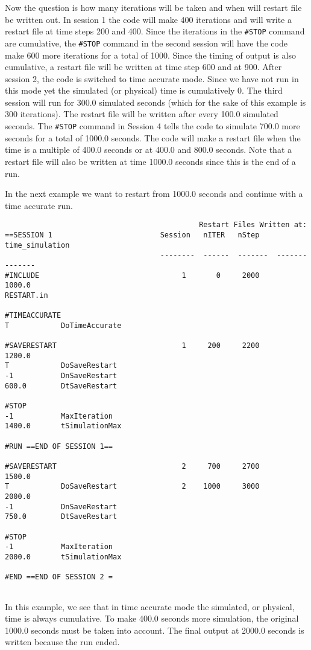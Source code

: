 Now the question is how many iterations will be taken and when will restart
file be written out.  In session 1 the code will make 400 iterations and will
write a restart file at time steps 200 and 400.  Since the iterations 
in the {\tt \#STOP}
command are cumulative, the {\tt \#STOP} command in the second session will
have the code make 600 more iterations for a total of 1000.  Since the timing
of output is also cumulative, a restart file will be written at time step 600
and at 900.
After session 2, the code is switched to time accurate mode.  Since we
have not run in this mode yet the simulated (or physical) time is cumulatively
0.  The third session will run for 300.0 simulated seconds (which for the
sake of this example is 300 iterations).  The restart file will be written
after every 100.0 simulated seconds.
The {\tt \#STOP} command in Session 4 tells the code to simulate  700.0 more 
seconds for a total of 1000.0 seconds.  The code will make a restart file
when the time is a multiple of 400.0 seconds or at 400.0 and 800.0 seconds.
Note that a restart file will also be written at time 1000.0
seconds since this is the end of a run.

In the next example we want to restart from 1000.0 seconds 
and continue with a time accurate run.
\begin{verbatim}
                                             Restart Files Written at:
==SESSION 1                         Session   nITER   nStep    time_simulation
                                    --------  ------  -------  --------------
#INCLUDE                                 1       0     2000          1000.0
RESTART.in

#TIMEACCURATE
T            DoTimeAccurate  

#SAVERESTART                             1     200     2200          1200.0
T            DoSaveRestart
-1           DnSaveRestart
600.0        DtSaveRestart

#STOP
-1           MaxIteration
1400.0       tSimulationMax

#RUN ==END OF SESSION 1== 

#SAVERESTART                             2     700     2700          1500.0
T            DoSaveRestart               2    1000     3000          2000.0
-1           DnSaveRestart
750.0        DtSaveRestart

#STOP
-1           MaxIteration
2000.0       tSimulationMax

#END ==END OF SESSION 2 = 
                          
\end{verbatim}
In this example, we see that in time accurate mode the simulated, or
physical, time is always cumulative.  To make 400.0 seconds more simulation,
the original 1000.0 seconds must be taken into account.  The final output 
at 2000.0 seconds is written because the run ended.

